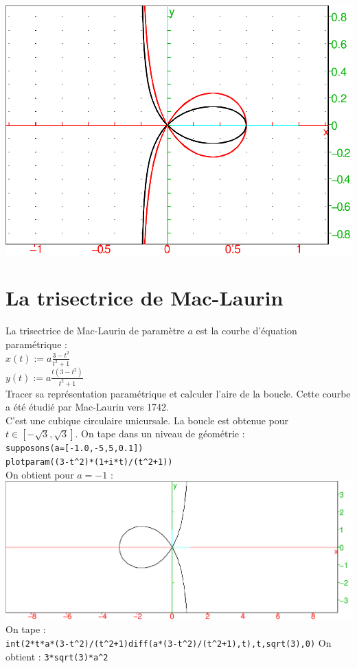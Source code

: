 \documentclass[a4paper,11pt]{book}
\begin{document}
\includegraphics[width=\textwidth]{foliumd2}
\section{La trisectrice de Mac-Laurin}
La trisectrice de Mac-Laurin de param\`etre $a$ est la courbe d'\'equation 
param\'etrique :\\
$x(t):=a\frac{3-t^2}{t^2+1}$\\
$y(t):=a\frac{t(3-t^2)}{t^2+1}$\\
Tracer sa repr\'esentation param\'etrique et calculer l'aire de la boucle.
Cette courbe a \'et\'e \'etudi\'e par Mac-Laurin vers 1742.\\
C'est une cubique circulaire unicursale.
La boucle est obtenue pour $t\in [-\sqrt 3,\sqrt 3]$.
On tape dans un niveau de g\'eom\'etrie :\\
{\tt supposons(a=[-1.0,-5,5,0.1])}\\
{\tt plotparam((3-t\verb|^|2)*(1+i*t)/(t\verb|^|2+1))}\\
On obtient pour $a=-1$ :\\
\includegraphics[width=\textwidth]{trisect}\\
On tape :\\
{\tt int(2*t*a*(3-t\verb|^|2)/(t\verb|^|2+1)diff(a*(3-t\verb|^|2)/(t\verb|^|2+1),t),t,sqrt(3),0)}
On obtient : {\tt 3*sqrt(3)*a\verb|^|2}
\end{document}
